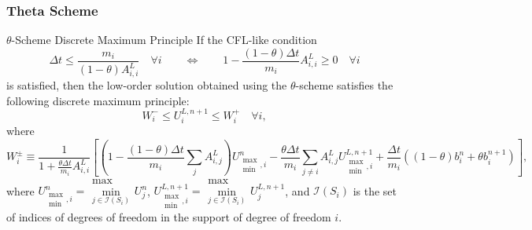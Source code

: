 \subsubsection{Theta Scheme}
\begin{theorem}{$\theta$-Scheme Discrete Maximum Principle}
If the CFL-like condition
\begin{equation}\label{theta_CFL}
   \Delta t \leq \frac{m_i}{(1-\theta)A_{i,i}^L}\quad\forall i
   \qquad\Longleftrightarrow\qquad
   1 - \frac{(1-\theta)\Delta t}{m_i}A_{i,i}^L \geq 0\quad\forall i
\end{equation}
is satisfied, then the low-order solution  obtained using the $\theta$-scheme
satisfies the following discrete maximum principle:
\begin{equation}\label{theta_max_principle}
   W_i^-\leq U_i^{L,n+1}\leq W_i^+\quad\forall i,
\end{equation}
where
\begin{equation}\label{theta_W}
   W_i^\pm \equiv \frac{1}{1+\frac{\theta\Delta t}{m_i}A_{i,i}^L}
     \left[\left(1 - \frac{(1-\theta)
     \Delta t}{m_i}\sum\limits_j A_{i,j}^L\right)U_{\substack{\max\\\min},i}^n
    -\frac{\theta\Delta t}{m_i}\sum\limits_{j\ne i}A_{i,j}^L
     U_{\substack{\max\\\min},i}^{L,n+1}
    +\frac{\Delta t}{m_i}\left((1-\theta)b_i^n + \theta b_i^{n+1}\right)\right],
\end{equation}
where $U_{\substack{\max\\\min},i}^n = \substack{\max\\\min\limits_{j\in
\mathcal{I}(S_i)}}U_j^n$,
$U_{\substack{\max\\\min},i}^{L,n+1} = \substack{\max\\\min\limits_{j\in
\mathcal{I}(S_i)}}U_j^{L,n+1}$,
and $\mathcal{I}(S_i)$ is the set of indices of degrees of freedom in the
support of degree of freedom $i$.
\end{theorem}
